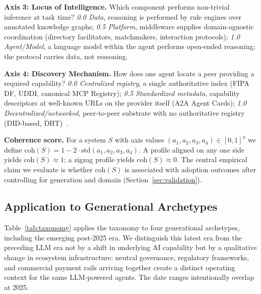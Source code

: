\documentclass[10pt,twocolumn]{article}
\begin{document}
\textbf{Axis 3: Locus of Intelligence.}  Which component performs non-trivial inference at task time?
\emph{0.0 Data}, reasoning is performed by rule engines over annotated knowledge graphs;
\emph{0.5 Platform}, middleware supplies domain-agnostic coordination (directory facilitators, matchmakers, interaction protocols);
\emph{1.0 Agent/Model}, a language model within the agent performs open-ended reasoning; the protocol carries data, not reasoning.

\textbf{Axis 4: Discovery Mechanism.}  How does one agent locate a peer providing a required capability?
\emph{0.0 Centralized registry}, a single authoritative index (FIPA DF, UDDI, canonical MCP Registry);
\emph{0.5 Standardized metadata}, capability descriptors at well-known URLs on the provider itself (A2A Agent Cards);
\emph{1.0 Decentralized/networked}, peer-to-peer substrate with no authoritative registry (DID-based, DHT)~\cite{W3C_ANP_2025}.

\textbf{Coherence score.}  For a system $S$ with axis values $(a_1, a_2, a_3, a_4) \in [0,1]^4$ we define $\mathrm{coh}(S) = 1 - 2\cdot\mathrm{std}(a_1, a_2, a_3, a_4)$.  A profile aligned on any one side yields $\mathrm{coh}(S) \approx 1$; a zigzag profile yields $\mathrm{coh}(S) \approx 0$.  The central empirical claim we evaluate is whether $\mathrm{coh}(S)$ is associated with adoption outcomes after controlling for generation and domain (Section~\ref{sec:validation}).

\subsection{Application to Generational Archetypes}

Table~\ref{tab:taxonomy} applies the taxonomy to four generational archetypes, including the emerging post-2025 era.  We distinguish this latest era from the preceding LLM era not by a shift in underlying AI capability but by a qualitative change in ecosystem infrastructure: neutral governance, regulatory frameworks, and commercial payment rails arriving together create a distinct operating context for the same LLM-powered agents.  The date ranges intentionally overlap at 2025.
\end{document}
